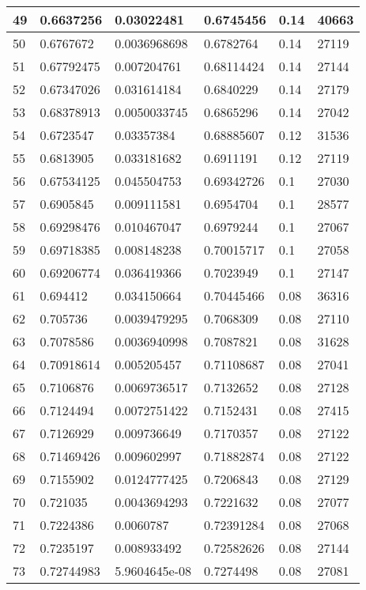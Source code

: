 \begin{longtable}{|l|l|l|l|l|l|}
49 & 0.6637256 & 0.03022481 & 0.6745456 & 0.14 & 40663 \\ \hline 
50 & 0.6767672 & 0.0036968698 & 0.6782764 & 0.14 & 27119 \\ \hline 
51 & 0.67792475 & 0.007204761 & 0.68114424 & 0.14 & 27144 \\ \hline 
52 & 0.67347026 & 0.031614184 & 0.6840229 & 0.14 & 27179 \\ \hline 
53 & 0.68378913 & 0.0050033745 & 0.6865296 & 0.14 & 27042 \\ \hline 
54 & 0.6723547 & 0.03357384 & 0.68885607 & 0.12 & 31536 \\ \hline 
55 & 0.6813905 & 0.033181682 & 0.6911191 & 0.12 & 27119 \\ \hline 
56 & 0.67534125 & 0.045504753 & 0.69342726 & 0.1 & 27030 \\ \hline 
57 & 0.6905845 & 0.009111581 & 0.6954704 & 0.1 & 28577 \\ \hline 
58 & 0.69298476 & 0.010467047 & 0.6979244 & 0.1 & 27067 \\ \hline 
59 & 0.69718385 & 0.008148238 & 0.70015717 & 0.1 & 27058 \\ \hline 
60 & 0.69206774 & 0.036419366 & 0.7023949 & 0.1 & 27147 \\ \hline 
61 & 0.694412 & 0.034150664 & 0.70445466 & 0.08 & 36316 \\ \hline 
62 & 0.705736 & 0.0039479295 & 0.7068309 & 0.08 & 27110 \\ \hline 
63 & 0.7078586 & 0.0036940998 & 0.7087821 & 0.08 & 31628 \\ \hline 
64 & 0.70918614 & 0.005205457 & 0.71108687 & 0.08 & 27041 \\ \hline 
65 & 0.7106876 & 0.0069736517 & 0.7132652 & 0.08 & 27128 \\ \hline 
66 & 0.7124494 & 0.0072751422 & 0.7152431 & 0.08 & 27415 \\ \hline 
67 & 0.7126929 & 0.009736649 & 0.7170357 & 0.08 & 27122 \\ \hline 
68 & 0.71469426 & 0.009602997 & 0.71882874 & 0.08 & 27122 \\ \hline 
69 & 0.7155902 & 0.0124777425 & 0.7206843 & 0.08 & 27129 \\ \hline 
70 & 0.721035 & 0.0043694293 & 0.7221632 & 0.08 & 27077 \\ \hline 
71 & 0.7224386 & 0.0060787 & 0.72391284 & 0.08 & 27068 \\ \hline 
72 & 0.7235197 & 0.008933492 & 0.72582626 & 0.08 & 27144 \\ \hline 
73 & 0.72744983 & 5.9604645e-08 & 0.7274498 & 0.08 & 27081 \\ \hline 

\end{longtable}
